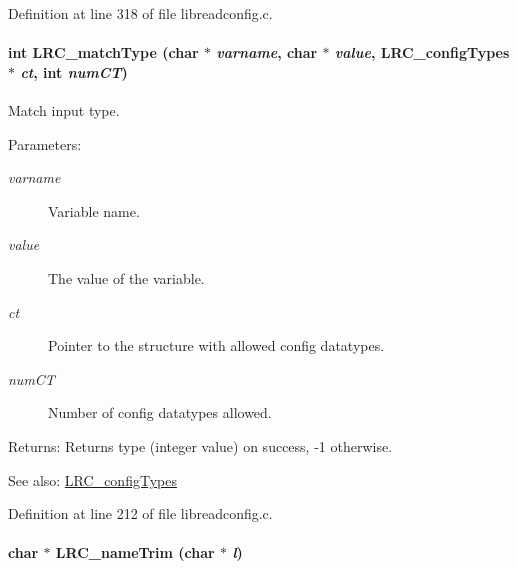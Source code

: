 Definition at line 318 of file libreadconfig.c.\hypertarget{group___l_r_c__internals_g4b2785b5ee9a3ab984c9dcfd3f9b3283}{
\paragraph[{LRC\_\-matchType}]{\setlength{\rightskip}{0pt plus 5cm}int LRC\_\-matchType (char $\ast$ {\em varname}, \/  char $\ast$ {\em value}, \/  {\bf LRC\_\-configTypes} $\ast$ {\em ct}, \/  int {\em numCT})}\hfill}
\label{group___l_r_c__internals_g4b2785b5ee9a3ab984c9dcfd3f9b3283}


Match input type. 

\begin{Desc}
\item[Parameters:]
\begin{description}
\item[{\em varname}]Variable name.\item[{\em value}]The value of the variable.\item[{\em ct}]Pointer to the structure with allowed config datatypes.\item[{\em numCT}]Number of config datatypes allowed.\end{description}
\end{Desc}
\begin{Desc}
\item[Returns:]Returns type (integer value) on success, -1 otherwise. \end{Desc}
\begin{Desc}
\item[See also:]\hyperlink{struct_l_r_c__config_types}{LRC\_\-configTypes} \end{Desc}


Definition at line 212 of file libreadconfig.c.\hypertarget{group___l_r_c__internals_g713edeb31c0d15e409403be5a5f28ad8}{
\paragraph[{LRC\_\-nameTrim}]{\setlength{\rightskip}{0pt plus 5cm}char $\ast$ LRC\_\-nameTrim (char $\ast$ {\em l})}\hfill}
\label{group___l_r_c__internals_g713edeb31c0d15e409403be5a5f28ad8}


